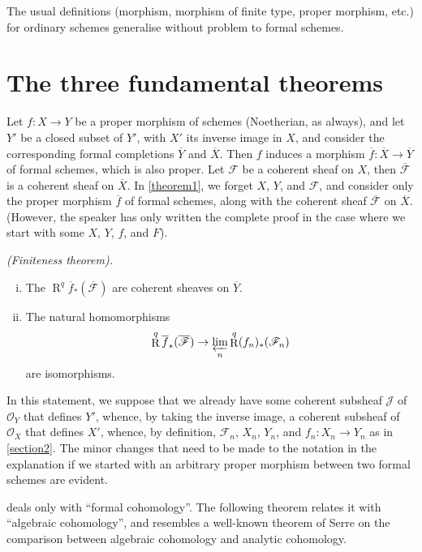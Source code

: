 \documentclass{article}
\theoremstyle{plain}
\newenvironment{theorem}[1]
  {\renewcommand\theinnercustomtheorem{#1}\innercustomtheorem}
  {\endinnercustomtheorem}
\theoremstyle{definition}
\newcommand{\sh}{\mathscr}
\DeclareMathOperator{\RR}{R}
\newcommand{\oldpage}[1]{\marginpar{\footnotesize$\Big\vert$ \textit{p.~#1}}}
\begin{document}
The usual definitions (morphism, morphism of finite type, proper morphism, etc.) for ordinary schemes generalise without problem to formal schemes.


\section{The three fundamental theorems}
\label{section3}

Let $f\colon X\to Y$ be a proper morphism of schemes (Noetherian, as always), and let $Y'$ be a closed subset of $Y'$, with $X'$ its inverse image in $X$, and consider the corresponding formal completions $\overline{Y}$ and $\overline{X}$.
Then $f$ induces a morphism $\overline{f}\colon\overline{X}\to\overline{Y}$ of formal schemes, which is also proper.
Let $\sh{F}$ be a coherent sheaf on $X$, then $\overline{\sh{F}}$ is a coherent sheaf on $\overline{X}$.
In \cref{theorem1}, we forget $X$, $Y$, and $\sh{F}$, and consider only the proper morphism $\overline{f}$ of formal schemes, along with the coherent sheaf $\overline{\sh{F}}$ on $\overline{X}$.
(However, the speaker has only written the complete proof in the case where we start with some $X$, $Y$, $f$, and $F$).

\begin{theorem}{1}
\label{theorem1}
  \emph{(Finiteness theorem).}
  \begin{enumerate}[i.]
    \item The $\RR^q\overline{f}_*(\overline{\sh{F}})$ are coherent sheaves on $\overline{Y}$.
    \item The natural homomorphisms
      \[
        \RR^q\overline{f}_*(\overline{\sh{F}}) \to \varprojlim_n\RR^q (f_n)_*(\sh{F}_n)
      \]
      are isomorphisms.
  \end{enumerate}
\end{theorem}

In this statement, we suppose that we already have some coherent subsheaf $\sh{J}$ of $\sh{O}_Y$ that defines $Y'$, whence, by taking the inverse image, a coherent subsheaf of $\sh{O}_X$ that defines $X'$, whence, by definition, $\sh{F}_n$, $X_n$, $Y_n$, and $f_n\colon X_n\to Y_n$ as in \cref{section2}.
The minor changes that need to be made to the notation in the explanation if we started with an arbitrary proper morphism between two formal schemes are evident.

 deals only with ``formal cohomology''.
The following theorem
\oldpage{182-05}
relates it with ``algebraic cohomology'', and resembles a well-known theorem of Serre \cite{4} on the comparison between algebraic cohomology and analytic cohomology.
\end{document}
